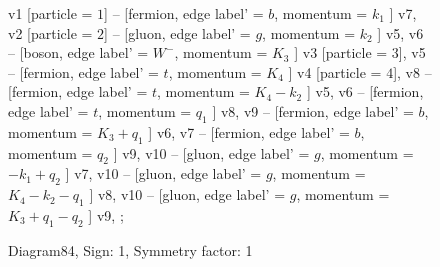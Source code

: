 \documentclass{revtex4}
\begin{document}
\begin{figure}[!htb]
\begin{center}
{v1 [particle = \(1\)] -- [fermion, edge label' = \(b\), momentum = \(k_{1}\) ] v7, 
v2 [particle = \(2\)] -- [gluon, edge label' = \(g\), momentum = \(k_{2}\) ] v5, 
v6 -- [boson, edge label' = \(W^{-}\), momentum = \(K_{3}\) ] v3 [particle = \(3\)], 
v5 -- [fermion, edge label' = \(t\), momentum = \(K_{4}\) ] v4 [particle = \(4\)], 
v8 -- [fermion, edge label' = \(t\), momentum = \(K_{4} - k_{2}\) ] v5, 
v6 -- [fermion, edge label' = \(t\), momentum = \(q_{1}\) ] v8, 
v9 -- [fermion, edge label' = \(b\), momentum = \(K_{3} + q_{1}\) ] v6, 
v7 -- [fermion, edge label' = \(b\), momentum = \(q_{2}\) ] v9, 
v10 -- [gluon, edge label' = \(g\), momentum = \(-k_{1} + q_{2}\) ] v7, 
v10 -- [gluon, edge label' = \(g\), momentum = \(K_{4} - k_{2} - q_{1}\) ] v8, 
v10 -- [gluon, edge label' = \(g\), momentum = \(K_{3} + q_{1} - q_{2}\) ] v9, 
};
\end{center}
\caption{Diagram84, Sign: 1, Symmetry factor: 1}
\end{figure}
\newpage
\end{document}
